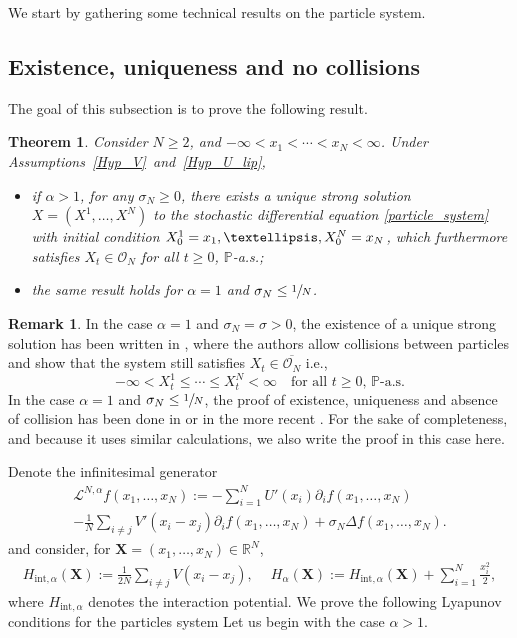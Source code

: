 \documentclass[11pt]{article}
\newcommand{\ie}{i.e.,\xspace}
\newcommand{\bX}{{\boldsymbol{X}}}
\newcommand{\rint}{\mathrm{int}}
\theoremstyle{plain}
\newtheorem{theorem}{Theorem}
\theoremstyle{definition}
\newtheorem{remark}{Remark}[section]
\begin{document}
We start by gathering some technical results on the particle system.

\subsection{Existence, uniqueness and no collisions}\label{sec_exist}

The goal of this subsection is to prove the following result.

\begin{theorem}\label{exist_unique}
Consider $N\geq 2$, and $-\infty<x_1<\cdots<x_N<\infty$. Under Assumptions~\ref{Hyp_V}~and~\ref{Hyp_U_lip},
\begin{itemize}
\item if $\alpha>1$, for any $\sigma_N\geq0$, there exists a unique strong solution $X=(X^1,\dots,X^N)$ to the stochastic differential equation \eqref{particle_system} with initial condition $X^1_0=x_1,\dots,\allowbreak X^N_0=\nobreak x_N$, which furthermore satisfies $X_t\in\mathcal{O}_N$ for all $t\geq0$, $\mathbb{P}$-a.s.;
\item the same result holds for $\alpha=1$ and $\sigma_N\leq\sfrac{1}{N}$.
\end{itemize}
\end{theorem}

\begin{remark}
In the case $\alpha=1$ and $\sigma_N=\sigma>0$, the existence of a unique strong solution has been written in \cite[Th.\,2.5]{cepa_lepingle}, where the authors allow collisions between particles and show that the system still satisfies $X_t\in\overline{\mathcal{O}_N}$ \ie
\[
-\infty<X^1_t\leq\cdots\leq X^N_t<\infty\quad\text{for all }t\geq0,\, \mathbb{P}\text{-a.s.}
\]
In the case $\alpha=1$ and $\sigma_N\leq\sfrac{1}{N}$, the proof of existence, uniqueness and absence of collision has been done in \cite{Rogers_Shi} or in the more recent \cite{Li_Li_Xie}. For the sake of completeness, and because it uses similar calculations, we also write the proof in this case here.
\end{remark}

Denote the infinitesimal generator
\begin{multline*}
\mathcal{L}^{N,\alpha}f(x_1,\dots,x_N):=-\sum_{i=1}^NU'(x_i)\partial_if(x_1,\dots,x_N)\\[-3pt]
-\frac{1}{N}\sum_{i\neq j}V'(x_i-x_j)\partial_if(x_1,\dots,x_N)+\sigma_N\Delta f(x_1,\dots,x_N).
\end{multline*}
and consider, for $\bX=(x_1,\dots,x_N)\in\mathbb{R}^N$,
\begin{align*}
H_{\rint, \alpha}(\bX):=\frac{1}{2N}\sum_{i\neq j}V(x_i-x_j),\quad \ H_{\alpha}(\bX):=H_{\rint, \alpha}(\bX)+\sum_{i=1}^N \frac{x^2_i}{2},
\end{align*}
where $H_{\rint,\alpha}$ denotes the interaction potential. We prove the following Lyapunov conditions for the particles system Let us begin with the case $\alpha>1$.
\end{document}
